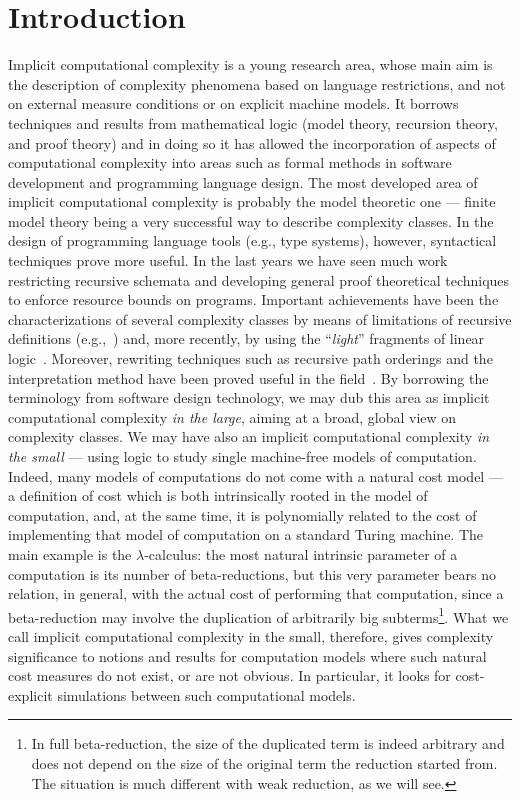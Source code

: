 \documentclass{LMCS}
\newcounter{number}
\begin{document}
\section*{Introduction}
\par
Implicit computational complexity is a young research area, whose main aim is the description of complexity phenomena 
based on language restrictions, and not on external 
measure conditions or on explicit machine models. 
It borrows techniques and results from mathematical logic (model theory, recursion theory, and proof theory)
and in doing so it has allowed the
incorporation of aspects of computational complexity into areas such as formal methods in software development
and programming language design. The most developed area of implicit computational complexity is probably the
model theoretic one --- finite model theory being a very successful way to describe
complexity classes. In the design of  programming language tools (e.g., type systems), however, syntactical
techniques prove more useful. In the last years we have seen much work restricting
recursive schemata and developing general proof theoretical techniques to enforce
resource bounds on programs. 
Important achievements have been the characterizations of several complexity classes
by means of limitations of recursive definitions (e.g.,~\cite{Bellantoni92CC,Leivant95RRI}) and, more recently, by 
using the ``\emph{light}'' fragments of 
linear logic~\cite{Girard98ic}. 
Moreover, rewriting techniques such as recursive path orderings and
the interpretation method have been proved useful in the field~\cite{Marion00}.
By borrowing the terminology from software design technology, we may dub this 
area as implicit computational complexity \emph{in the large}, aiming at a broad, global view on complexity classes.
We may have also an implicit computational complexity \emph{in the small} ---
using logic to study single machine-free models of computation. Indeed, many models of computations do not come
with a natural cost model --- a definition of cost which is both intrinsically rooted in the model of 
computation, and, at the same time, it is polynomially related to the cost of implementing that
model of computation on a standard Turing machine. The main example is the $\lambda$-calculus: the most natural intrinsic
parameter of a computation is its number of beta-reductions, but this very parameter bears no
relation, in general, with the actual cost of performing that computation, since a beta-reduction may involve the duplication of arbitrarily big subterms\footnote{
In full beta-reduction, the size of the duplicated term is indeed arbitrary and does not depend on
the size of the original term the reduction started from. The situation is much different with weak 
reduction, as we will see.}.
What we call implicit computational complexity in the small, therefore, gives complexity significance to
notions and results for computation models where such natural cost measures do not exist, or are
not obvious. In particular, it looks for cost-explicit simulations between such computational models.
\end{document}
